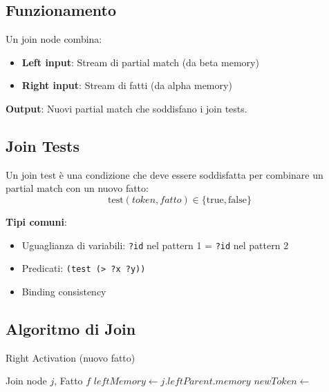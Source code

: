\subsection{Funzionamento}

Un join node combina:
\begin{itemize}
\item \textbf{Left input}: Stream di partial match (da beta memory)
\item \textbf{Right input}: Stream di fatti (da alpha memory)
\end{itemize}

\textbf{Output}: Nuovi partial match che soddisfano i join tests.

\subsection{Join Tests}

\begin{definizione}
Un join test è una condizione che deve essere soddisfatta per combinare un partial match con un nuovo fatto:
\begin{equation}
\text{test}(token, fatto) \in \{\text{true}, \text{false}\}
\end{equation}
\end{definizione}

\textbf{Tipi comuni}:
\begin{itemize}
\item Uguaglianza di variabili: \texttt{?id} nel pattern 1 = \texttt{?id} nel pattern 2
\item Predicati: \texttt{(test (> ?x ?y))}
\item Binding consistency
\end{itemize}

\subsection{Algoritmo di Join}

\begin{algorithm}
\caption{Right Activation (nuovo fatto)}
\begin{algorithmic}[1]
\Require Join node $j$, Fatto $f$
  \State $leftMemory \gets j.leftParent.memory$
      \State $newToken \gets $ 
      \State {}
    \EndIf
  \EndFor
\EndFunction
\end{algorithmic}
\end{algorithm}

